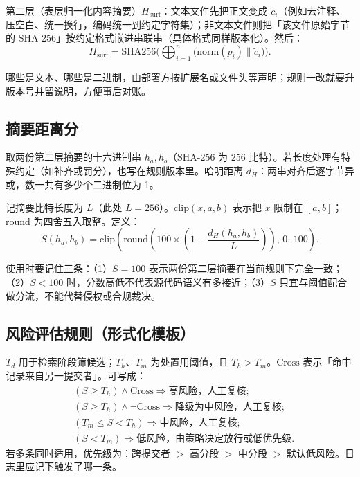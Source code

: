 \documentclass[UTF8,a4paper,zihao=5]{ctexart}
\begin{document}
第二层（表层归一化内容摘要）$H_{\mathrm{surf}}$：文本文件先把正文变成 $\tilde{c}_i$（例如去注释、压空白、统一换行，编码统一到约定字符集）；非文本文件则把「该文件原始字节的 SHA-256」按约定格式嵌进串联串（具体格式同样版本化）。然后：
\begin{equation}
H_{\mathrm{surf}} = \mathrm{SHA256}\Big(\bigoplus_{i=1}^{n}\bigl(\mathrm{norm}(p_i) \parallel \tilde{c}_i\bigr)\Big).
\end{equation}

哪些是文本、哪些是二进制，由部署方按扩展名或文件头等声明；规则一改就要升版本号并留说明，方便事后对账。

\subsection{摘要距离分}
\label{sec:digest-score}
取两份第二层摘要的十六进制串 $h_a,h_b$（SHA-256 为 256 比特）。若长度处理有特殊约定（如补齐或罚分），也写在规则版本里。哈明距离 $d_H$：两串对齐后逐字节异或，数一共有多少个二进制位为 1。

记摘要比特长度为 $L$（此处 $L=256$）。$\mathrm{clip}(x,a,b)$ 表示把 $x$ 限制在 $[a,b]$；$\mathrm{round}$ 为四舍五入取整。定义：
\begin{equation}
S(h_a,h_b) = \mathrm{clip}\left(\mathrm{round}\left(100 \times \left(1-\frac{d_H(h_a,h_b)}{L}\right)\right),\,0,\,100\right).
\end{equation}

使用时要记住三条：（1）$S=100$ 表示两份第二层摘要在当前规则下完全一致；（2）$S<100$ 时，分数高低不代表源代码语义有多接近；（3）$S$ 只宜与阈值配合做分流，不能代替侵权或合规裁决。

\subsection{风险评估规则（形式化模板）}
$T_d$ 用于检索阶段筛候选；$T_h$、$T_m$ 为处置用阈值，且 $T_h>T_m$。$\mathrm{Cross}$ 表示「命中记录来自另一提交者」。可写成：
\begin{align*}
  & (S \geq T_h) \wedge \mathrm{Cross} \Rightarrow \text{高风险，人工复核};\\
  & (S \geq T_h) \wedge \neg\mathrm{Cross} \Rightarrow \text{降级为中风险，人工复核};\\
  & (T_m \leq S < T_h) \Rightarrow \text{中风险，人工复核};\\
  & (S < T_m) \Rightarrow \text{低风险，由策略决定放行或低优先级}.
\end{align*}
若多条同时适用，优先级为：跨提交者 $>$ 高分段 $>$ 中分段 $>$ 默认低风险。日志里应记下触发了哪一条。
\end{document}

